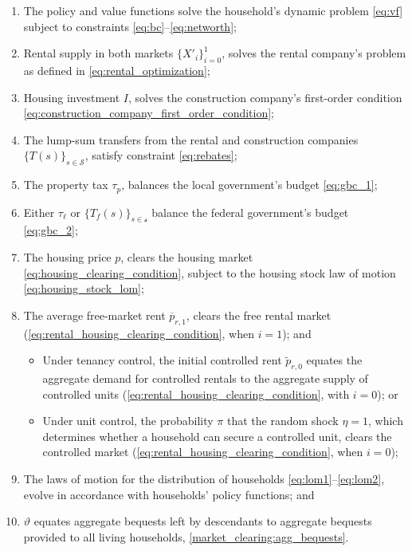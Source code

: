 \documentclass[parskip=full]{article}
\begin{document}
\begin{enumerate}
\item The policy and value functions solve the household's dynamic problem \eqref{eq:vf} subject to constraints \eqref{eq:bc}--\eqref{eq:networth};
\item Rental supply in both markets $\{X'_{i}\}^{1}_{i=0}$, solves the rental company's problem as defined in \eqref{eq:rental_optimization};
\item Housing investment $I$, solves the construction company's first-order condition \eqref{eq:construction_company_first_order_condition};
\item The lump-sum transfers from the rental and construction companies $\{T(s)\}_{s \in \mathcal{S}}$, satisfy constraint \eqref{eq:rebates};
\item The property tax $\tau_p$, balances the local government's budget \eqref{eq:gbc_1};
\item Either $\tau_{\ell}$ or $\{T_{f}(s)\}_{s\in \mathcal{s}}$ balance the federal government's budget \eqref{eq:gbc_2};
\item The housing price $p$, clears the housing market
\eqref{eq:housing_clearing_condition}, subject to the housing stock law of motion \eqref{eq:housing_stock_lom};
\item The average free-market rent $\overline{p}_{r,1}$, clears the free rental market (\eqref{eq:rental_housing_clearing_condition}, when $i=1$); and
\begin{itemize}
    \item Under tenancy control, the initial controlled rent $\tilde{p}_{r,0}$ equates the aggregate demand for controlled rentals to the aggregate supply of controlled units (\eqref{eq:rental_housing_clearing_condition}, with $i=0$); or
    \item Under unit control, the probability $\pi$ that the random shock $\eta=1$, which determines whether a household can secure a controlled unit, clears the controlled market (\eqref{eq:rental_housing_clearing_condition}, when $i=0$);
\end{itemize}
\item The laws of motion for the distribution of households \eqref{eq:lom1}--\eqref{eq:lom2}, evolve in accordance with households' policy functions; and
\item $\vartheta$ equates aggregate bequests left by descendants to aggregate bequests provided to all living households, \eqref{market_clearing:agg_bequests}.
\end{enumerate}
\end{document}

